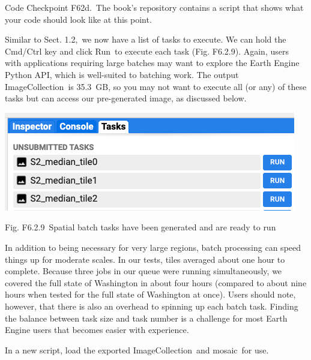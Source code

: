 \documentclass[
  letterpaper,
  DIV=11,
  numbers=noendperiod]{scrreprt}
\begin{document}
\begin{tcolorbox}[enhanced jigsaw, left=2mm, breakable, rightrule=.15mm, opacityback=0, colframe=quarto-callout-note-color-frame, colbacktitle=quarto-callout-note-color!10!white, arc=.35mm, opacitybacktitle=0.6, toptitle=1mm, colback=white, leftrule=.75mm, title=\textcolor{quarto-callout-note-color}{\faInfo}\hspace{0.5em}{Note}, toprule=.15mm, bottomtitle=1mm, titlerule=0mm, bottomrule=.15mm, coltitle=black]

Code Checkpoint F62d.~The book's repository contains a script that shows
what your code should look like at this point.

\end{tcolorbox}

Similar to Sect. 1.2,~we now have a list of tasks to execute. We can
hold the Cmd/Ctrl key and click Run~to execute each task (Fig. F6.2.9).
Again, users with applications requiring large batches may want to
explore the Earth Engine Python API, which is well-suited to batching
work. The output ImageCollection~is 35.3~GB, so you may not want to
execute all (or any) of these tasks but can access our pre-generated
image, as discussed below.

\includegraphics{./F6/image22.png}

Fig. F6.2.9~Spatial batch tasks have been generated and are ready to run

In addition to being necessary for very large regions, batch processing
can speed things up for moderate scales. In our tests, tiles averaged
about one hour to complete. Because three jobs in our queue were running
simultaneously, we covered the full state of Washington in about four
hours (compared to about nine hours when tested for the full state of
Washington at once). Users should note, however, that there is also an
overhead to spinning up each batch task. Finding the balance between
task size and task number is a challenge for most Earth Engine users
that becomes easier with experience.

In a new script, load the exported ImageCollection~and mosaic~for use.
\end{document}
